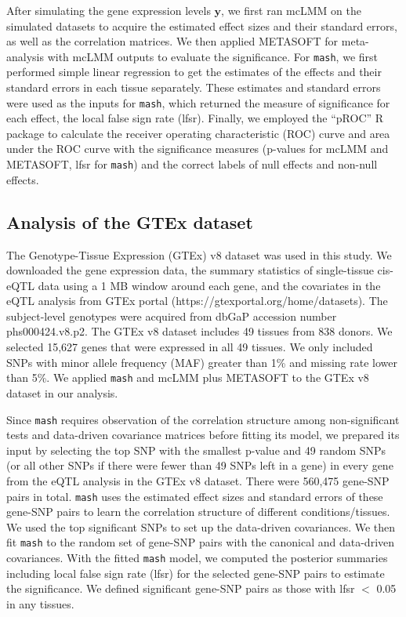         After simulating the gene expression levels $\mathbf{y}$, we first ran mcLMM on the simulated datasets to acquire the estimated effect sizes and their standard errors, as well as the correlation matrices. We then applied METASOFT for meta-analysis with mcLMM outputs to evaluate the significance. For \texttt{mash}, we first performed simple linear regression to get the estimates of the effects and their standard errors in each tissue separately. These estimates and standard errors were used as the inputs for \texttt{mash}, which returned the measure of significance for each effect, the local false sign rate (lfsr). Finally, we employed the ``pROC'' R package \cite{Robin2011-ww} to calculate the receiver operating characteristic (ROC) curve and area under the ROC curve with the significance measures (p-values for mcLMM and METASOFT, lfsr for \texttt{mash}) and the correct labels of null effects and non-null effects.
    
    \subsection{Analysis of the GTEx dataset}
        The Genotype-Tissue Expression (GTEx) v8 dataset \cite{GTEx_Consortium2020-xx} was used in this study. We downloaded the gene expression data, the summary statistics of single-tissue cis-eQTL data using a 1 MB window around each gene, and the covariates in the eQTL analysis from GTEx portal (https://gtexportal.org/home/datasets). The subject-level genotypes were acquired from dbGaP accession number phs000424.v8.p2. The GTEx v8 dataset includes 49 tissues from 838 donors. We selected 15,627 genes that were expressed in all 49 tissues. We only included SNPs with minor allele frequency (MAF) greater than 1\% and missing rate lower than 5\%. We applied \texttt{mash} and mcLMM plus METASOFT to the GTEx v8 dataset in our analysis. 
        
        Since \texttt{mash} requires observation of the correlation structure among non-significant tests and data-driven covariance matrices before fitting its model, we prepared its input by selecting the top SNP with the smallest p-value and 49 random SNPs (or all other SNPs if there were fewer than 49 SNPs left in a gene) in every gene from the eQTL analysis in the GTEx v8 dataset. There were 560,475 gene-SNP pairs in total. \texttt{mash} uses the estimated effect sizes and standard errors of these gene-SNP pairs to learn the correlation structure of different conditions/tissues. We used the top significant SNPs to set up the data-driven covariances. We then fit \texttt{mash} to the random set of gene-SNP pairs with the canonical and data-driven covariances. With the fitted \texttt{mash} model, we computed the posterior summaries including local false sign rate (lfsr) \cite{stephens2017false} for the selected gene-SNP pairs to estimate the significance. We defined significant gene-SNP pairs as those with lfsr $<$ 0.05 in any tissues. 
        
